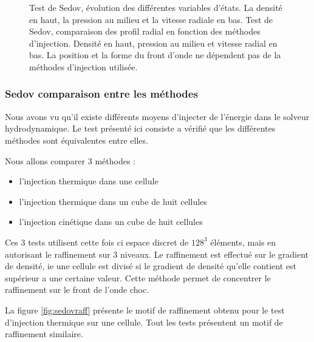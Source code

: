 \begin{figure}[bth]
\begin{minipage}[c]{.46\linewidth}
   \end{minipage}

        \caption{Test de Sedov, évolution des différentes variables d'états. La densité en haut, la pression au milieu et la vitesse radiale en bas.        
        Test de Sedov, comparaison des profil radial en fonction des  méthodes d'injection. 
        Densité en haut, pression au milieu et vitesse radial en bas.
        La position et la forme du front d'onde ne dépendent pas de la méthodes d'injection utilisée.
 		}
 		\label{fig:sedov_evol}
\end{figure}



\subsubsection{Sedov comparaison entre les méthodes}

Nous avons vu qu'il existe différents moyens d'injecter de l'énergie dans le solveur hydrodynamique.
Le test présenté ici consiste a vérifié que les différentes méthodes sont équivalentes entre elles.

Nous allons comparer 3 méthodes : 
\begin{itemize}
\item l'injection thermique dans une cellule 
\item l'injection thermique dans un cube de huit cellules
\item l'injection cinétique  dans un cube de huit cellules
\end{itemize}


Ces 3 tests utilisent cette fois ci espace discret de  $128^3$ éléments, mais en autorisant le raffinement sur 3 niveaux.
Le raffinement est effectué sur le gradient de densité, ie une cellule est divisé si le gradient de densité qu'elle contient est supérieur a une certaine valeur.
Cette méthode permet de concentrer le raffinement sur le front de l'onde choc.

La figure \ref{fig:sedovraff} présente le motif de raffinement obtenu pour le test d'injection thermique sur une cellule.
Tout les tests présentent un motif de raffinement similaire.


